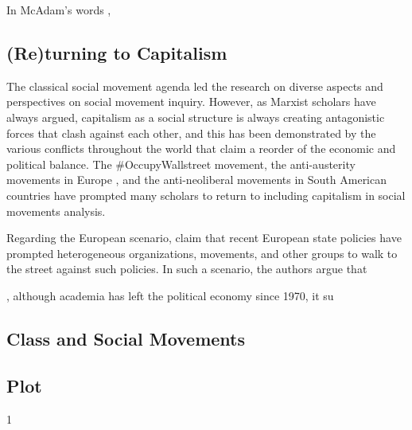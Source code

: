 \documentclass[12pt]{article}
\begin{document}
In McAdam's words \citet{mcadamPoliticalProcessDevelopment1999},

\citep{mcadamDynamicsContention2004}

\hypertarget{returning-to-capitalism}{%
\subsection{(Re)turning to Capitalism}\label{returning-to-capitalism}}

The classical social movement agenda led the research on diverse aspects
and perspectives on social movement inquiry. However, as Marxist
scholars have always argued, capitalism as a social structure is always
creating antagonistic forces that clash against each other, and this has
been demonstrated by the various conflicts throughout the world that
claim a reorder of the economic and political balance. The
\#OccupyWallstreet movement, the anti-austerity movements in Europe
\citep{dellaportaSocialMovementsTimes2020}, and the anti-neoliberal
movements in South American countries \citep{sommaNoWaterOasis2020} have
prompted many scholars to return to including capitalism in social
movements analysis.

Regarding the European scenario,
\citet{dellaportaSocialMovementsTimes2020} claim that recent European
state policies have prompted heterogeneous organizations, movements, and
other groups to walk to the street against such policies. In such a
scenario, the authors argue that

, although academia has left the political economy since 1970, it su

\hypertarget{class-and-social-movements}{%
\subsection{Class and Social
Movements}\label{class-and-social-movements}}

\hypertarget{plot}{%
\subsection{Plot}\label{plot}}

1
\end{document}
